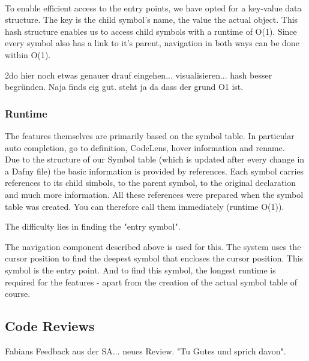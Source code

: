  \\

To enable efficient access to the entry points, we have opted for a key-value data structure. The key is the child symbol's name, the value the actual  object.
This hash structure enables us to access child symbols with a runtime of O(1). Since every symbol also has a link to it's parent, navigation in both ways can be done within O(1).

2do hier noch etwas genauer drauf eingehen... visualisieren... hash besser begründen. Naja finds eig gut. steht ja da dass der grund O1 ist.

\subsubsection{Runtime}


The features themselves are primarily based on the symbol table.
In particular auto completion, go to definition, CodeLens, hover information and rename. \\

Due to the structure of our Symbol table (which is updated after every change in a Dafny file)
the basic information is provided by references.
Each symbol carries references to its child simbols, to the parent symbol, to the original declaration and much more information.
All these references were prepared when the symbol table was created. You can therefore call them immediately (runtime O(1)).  

The difficulty lies in finding the "entry symbol".

The navigation component described above is used for this. The system uses the cursor position to find the deepest symbol that encloses the cursor position. This symbol is the entry point. And to find this symbol, the longest runtime is required for the features - apart from the creation of the actual symbol table of course.




\subsection{Code Reviews}
Fabians Feedback aus der SA... neues Review. "Tu Gutes und sprich davon".

